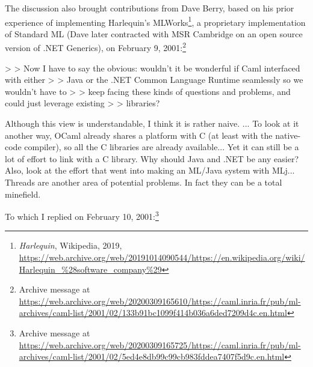 \documentclass[acmsmall]{acmart}\settopmatter{}
\begin{document}
The discussion also brought contributions from Dave Berry, based on his prior experience of implementing
Harlequin’s MLWorks\footnote{\textit{Harlequin}, Wikipedia, 2019, \url{https://web.archive.org/web/20191014090544/https://en.wikipedia.org/wiki/Harlequin_\%28software_company\%29}}, a proprietary
implementation of Standard ML (Dave later contracted with MSR Cambridge on an open source version of .NET Generics), on February
9, 2001:\footnote{Archive message at \url{https://web.archive.org/web/20200309165610/https://caml.inria.fr/pub/ml-archives/caml-list/2001/02/133b91bc1099f414b036a6ded7209d4c.en.html}}
\begin{verbquote}
> > Now I have to say the obvious: wouldn't it be wonderful if Caml interfaced with either 
> > Java or the .NET Common Language Runtime seamlessly so we wouldn't have to 
> > keep facing these kinds of questions and problems, and could just leverage existing 
> > libraries?   

Although this view is understandable, I think it is rather naive. ... To look at it another way, OCaml already shares a platform with C (at least with the native-code compiler), so all the C libraries are already available... Yet it can still be a lot of effort to link with a C library.  Why should Java and .NET be any easier?  Also, look at the effort that went into making an ML/Java system with MLj... Threads are another area of potential problems.  In fact they can be a total minefield.
\end{verbquote}
To which I replied on February 10, 2001:\footnote{Archive message at \url{https://web.archive.org/web/20200309165725/https://caml.inria.fr/pub/ml-archives/caml-list/2001/02/5ed4e8db99c99cb983fddea7407f5d9c.en.html}}
\end{document}

